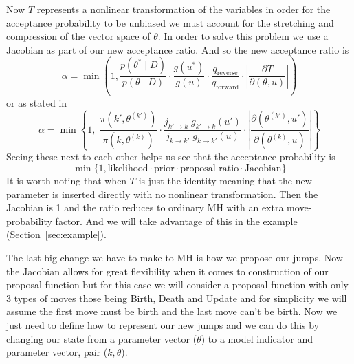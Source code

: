 \documentclass[10pt]{article}
\begin{document}
Now \(T\) represents a nonlinear transformation of the variables in order for the acceptance probability to be unbiased we must account for the stretching and compression of the vector space of \(\theta\). In order to solve this problem we use a Jacobian as part of our new acceptance ratio. And so the new acceptance ratio is $$\alpha = \min\!\left(1, \frac{p(\theta^* \mid D)}{p(\theta\mid D)} \cdot \frac{g(u^*)}{g(u)} \cdot \frac{q_\text{reverse}}{q_\text{forward}} \cdot \left|\frac{\partial T}{\partial(\theta,u)}\right| \right)$$ or as stated in \textcite{green1995reversible} \[
\alpha = \min\!\left\{1,\;
\frac{\pi(k', \theta^{(k')})}{\pi(k, \theta^{(k)})}
\cdot
\frac{j_{k' \to k}\; g_{k' \to k}(u')}{j_{k \to k'}\; g_{k \to k'}(u)}
\cdot
\left|\frac{\partial(\theta^{(k')}, u')}{\partial(\theta^{(k)}, u)}\right|
\right\}
\]
Seeing these next to each other helps us see that the acceptance probability is \[\min \{1, \text{likelihood} \cdot \text{prior} \cdot \text{proposal ratio} \cdot \text{Jacobian}\}\]
It is worth noting that when $T$ is just the identity meaning that the new parameter is inserted directly with no nonlinear transformation. Then the Jacobian is 1 and the ratio reduces to ordinary MH with an extra move-probability factor. And we will take advantage of this in the example (Section~\ref{sec:example}). 

The last big change we have to make to MH is how we propose our jumps. Now the Jacobian allows for great flexibility when it comes to construction of our proposal function but for this case we will consider a proposal function with only $3$ types of moves those being Birth, Death and Update and for simplicity we will assume the first move must be birth and the last move can't be birth. Now we just need to define how to represent our new jumps and we can do this by changing our state from a parameter vector ($\theta$) to a model indicator and parameter vector, pair ($k, \theta$).
\end{document}

